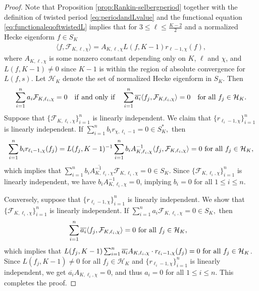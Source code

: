 \documentclass[11pt,letterpaper,reqno]{amsart}
\numberwithin{figure}{section}
\numberwithin{table}{section}
\theoremstyle{definition}
\theoremstyle{plain}
\theoremstyle{definition}
\theoremstyle{definition}
\theoremstyle{remark}
\numberwithin{equation}{section}
\theoremstyle{remark}
\begin{document}
\begin{proof}
Note that Proposition \ref{prop:Rankin-selbergperiod} together with the definition of twisted period \eqref{eq:periodandLvalue}  and the functional equation \eqref{eq:functionaleqoftwistedL} implies that for $3\leq\ell\leq\frac{K-2}{2}$ and a normalized Hecke eigenform $f\in S_K$
\begin{align}
\langle f, \mathcal{F}_{K,\ell,\chi}\rangle=A_{K,\ell,\chi}L(f,K-1) r_{\ell-1,\chi}(f), \nonumber
\end{align}
 where $A_{K,\ell,\chi}$ is some nonzero constant depending only on $K$, $\ell$ and $\chi$, and $L(f,K-1)\neq0$ since $K-1$ is within the region of absolute convergence for $L(f,s)$. Let $\mathcal{H}_K$ denote the set of normalized Hecke eigenform in $S_K$. Then
\begin{align}\sum_{i=1}^na_i\mathcal{F}_{K,\ell_i,\chi}=0\quad{\rm if~and~only~if}\quad\sum_{i=1}^n\overline{a_i}\langle f_j,\mathcal{F}_{K,\ell_i,\chi}\rangle=0\quad{\rm for~all}~f_j\in\mathcal{H}_K.\label{eq:suminnerproduct} \nonumber\end{align} 
Suppose that $\{\mathcal{F}_{K,\ell_i,\chi}\}_{i=1}^n$ is linearly independent. We claim that $\{r_{\ell_i-1,\chi}\}_{i=1}^n$
is linearly independent. If $\sum_{i=1}^n b_ir_{\chi,\ell_{i}-1}=0\in S_K^{\ast},$ then
\begin{align}
    \sum_{i=1}^nb_i r_{\ell_i-1,\chi}(f_j)=L(f_j,K-1)^{-1}\sum_{i=1}^nb_iA_{K,\ell_i,\chi}^{-1}\langle f_j,\mathcal{F}_{K,\ell_i,\chi}\rangle=0~{\rm for~all}~f_j\in\mathcal{H}_K, \nonumber
\end{align}
which implies that
$\sum_{i=1}^n\overline{b_iA_{K,\ell_i,\chi}^{-1}}\mathcal{F}_{K,\ell_i,\chi}=0\in S_K$.
Since $\{\mathcal{F}_{K,\ell_i,\chi}\}_{i=1}^n$ is linearly independent, we have $b_iA_{K,\ell_i,\chi}^{-1}=0$, implying $b_i=0$ for all $1\leq i\leq n$. 

Conversely, suppose that $\{r_{\ell_i-1,\chi}\}_{i=1}^n$
is linearly independent. We show that $\{\mathcal{F}_{K,\ell_i,\chi}\}_{i=1}^n$ is linearly independent.  If
$\sum_{i=1}^n a_i\mathcal{F}_{K,\ell_i,\chi}=0\in S_K,$
then
\begin{align}&\sum_{i=1}^n\overline{a_i}\langle f_j,\mathcal{F}_{K,\ell_i,\chi}\rangle=0~{\rm for~all}~f_j\in\mathcal{H}_K, \nonumber\end{align}
which implies that $L(f_j,K-1)\sum_{i=1}^n\overline{a_i}A_{K,\ell_i,\chi}\cdot r_{\ell_i-1,\chi}(f_j)=0~{\rm for~all}~f_j\in\mathcal{H}_K$.
Since $L(f_j,K-1)\neq0$ for all $f_j\in\mathcal{H}_K$ and $\{r_{\ell_i-1,\chi}\}_{i=1}^n$
is linearly independent, we get $\overline{a_i}A_{K,\ell_i,\chi}=0$, and thus $a_i=0$ for all $1\leq i\leq n$. This completes the proof.
\end{proof}
\end{document}
